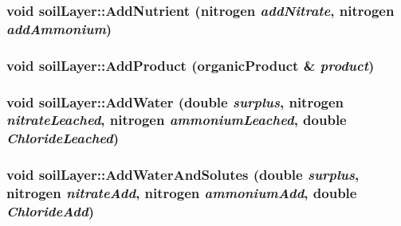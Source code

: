 \label{classsoil_layer_a09f4c3dc099147645d71480166261191}
\hypertarget{classsoil_layer_a1cdb99656097b11d7b7acb329dd6cd5e}{
\subsubsection[{AddNutrient}]{\setlength{\rightskip}{0pt plus 5cm}void soilLayer::AddNutrient ({\bf nitrogen} {\em addNitrate}, \/  {\bf nitrogen} {\em addAmmonium})}}
\label{classsoil_layer_a1cdb99656097b11d7b7acb329dd6cd5e}
\hypertarget{classsoil_layer_a02f3d74a63ae05911287bd29ce22427c}{
\subsubsection[{AddProduct}]{\setlength{\rightskip}{0pt plus 5cm}void soilLayer::AddProduct ({\bf organicProduct} \& {\em product})}}
\label{classsoil_layer_a02f3d74a63ae05911287bd29ce22427c}
\hypertarget{classsoil_layer_a491ca2b3b788a1c66221610124e19929}{
\subsubsection[{AddWater}]{\setlength{\rightskip}{0pt plus 5cm}void soilLayer::AddWater (double {\em surplus}, \/  {\bf nitrogen} {\em nitrateLeached}, \/  {\bf nitrogen} {\em ammoniumLeached}, \/  double {\em ChlorideLeached})}}
\label{classsoil_layer_a491ca2b3b788a1c66221610124e19929}
\hypertarget{classsoil_layer_af8268406c1828af1fdd3fe704d386f1e}{
\subsubsection[{AddWaterAndSolutes}]{\setlength{\rightskip}{0pt plus 5cm}void soilLayer::AddWaterAndSolutes (double {\em surplus}, \/  {\bf nitrogen} {\em nitrateAdd}, \/  {\bf nitrogen} {\em ammoniumAdd}, \/  double {\em ChlorideAdd})}}
\label{classsoil_layer_af8268406c1828af1fdd3fe704d386f1e}


